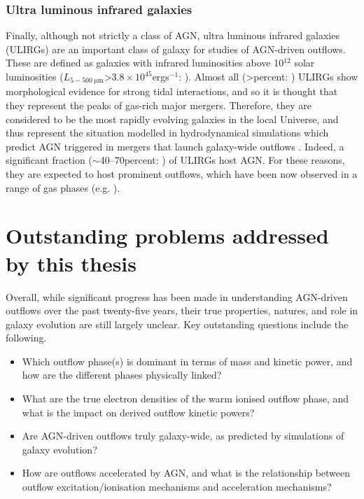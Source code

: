\subsubsection{Ultra luminous infrared galaxies}
\label{section: introduction: outflows: taxonomy_of_agn: ulirgs}

Finally, although not strictly a class of AGN, ultra luminous infrared galaxies (ULIRGs) are an important class of galaxy for studies of AGN-driven outflows. These are defined as galaxies with infrared luminosities above 10$^{12}$ solar luminosities ($L_\mathrm{5-500\;\mu{m}}$\;\textgreater\;$3.8\times10^{45}$\;erg\;s$^{-1}$: \citealt{Sanders1996}). Almost all (\textgreater{}\;per\;cent: \citealt{Veilleux2002}) ULIRGs show morphological evidence for strong tidal interactions, and so it is thought that they represent the peaks of gas-rich major mergers. Therefore, they are considered to be the most rapidly evolving galaxies in the local Universe, and thus represent the situation modelled in hydrodynamical simulations which predict AGN triggered in mergers that launch galaxy-wide outflows \citep{DiMatteo2005, Springel2005, Hopkins2008, Johansson2009}. Indeed, a significant fraction ($\sim$40--70\;per\;cent: \citealt{Kim1998, Veilleux2002, Nardini2010, AlonsoHerrero2012}) of ULIRGs host AGN. For these reasons, they are expected to host prominent outflows, which have been now observed in a range of gas phases (e.g. \citealt{Zaurin2013, Spence2018, Rose2018, Tadhunter2019, Lamperti2022}).

\newpage

\section{Outstanding problems addressed by this thesis}
\label{section: introduction: outstanding problems}

Overall, while significant progress has been made in understanding AGN-driven outflows over the past twenty-five years, their true properties, natures, and role in galaxy evolution are still largely unclear. Key outstanding questions include the following. \\

\begin{itemize}
    \item Which outflow phase(s) is dominant in terms of mass and kinetic power, and how are the different phases physically linked?
    \item What are the true electron densities of the warm ionised outflow phase, and what is the impact on derived outflow kinetic powers?
    \item Are AGN-driven outflows truly galaxy-wide, as predicted by simulations of galaxy evolution?
    \item How are outflows accelerated by AGN, and what is the relationship between outflow excitation/ionisation mechanisms and acceleration mechanisms? \\
\end{itemize}

